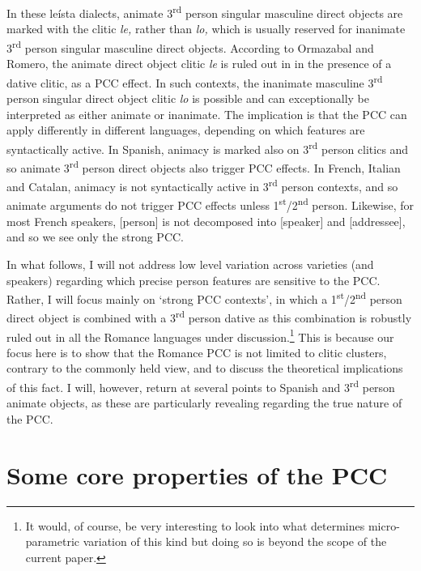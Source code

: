 \documentclass[output=paper,modfonts,nonflat]{langsci/langscibook}
\begin{document}
In these leísta dialects, animate 3\textsuperscript{rd} person singular masculine direct objects are marked with the clitic \textit{le,} rather than \textit{lo,} which is usually reserved for inanimate 3\textsuperscript{rd} person singular masculine direct objects. According to Ormazabal and Romero, the animate direct object clitic \textit{le} is ruled out in  in the presence of a dative clitic, as a PCC effect. In such contexts, the inanimate masculine 3\textsuperscript{rd} person singular direct object clitic \textit{lo} is possible and can exceptionally be interpreted as either animate or inanimate. The implication is that the PCC can apply differently in different languages, depending on which features are syntactically active. In Spanish, animacy is marked also on 3\textsuperscript{rd} person clitics and so animate 3\textsuperscript{rd} person direct objects also trigger PCC effects. In French, Italian and Catalan, animacy is not syntactically active in 3\textsuperscript{rd} person contexts, and so animate arguments do not trigger PCC effects unless 1\textsuperscript{st}/2\textsuperscript{nd} person. Likewise, for most French speakers, [person] is not decomposed into [speaker] and [addressee], and so we see only the strong PCC.

In what follows, I will not address low level variation across varieties (and speakers) regarding which precise person features are sensitive to the PCC. Rather, I will focus mainly on ‘strong PCC contexts’, in which a 1\textsuperscript{st}/2\textsuperscript{nd} person direct object is combined with a 3\textsuperscript{rd} person dative as this combination is robustly ruled out in all the Romance languages under discussion.\footnote{It would, of course, be very interesting to look into what determines micro-parametric variation of this kind but doing so is beyond the scope of the current paper.}  This is because our focus here is to show that the Romance PCC is not limited to clitic clusters, contrary to the commonly held view, and to discuss the theoretical implications of this fact. I will, however, return at several points to Spanish and 3\textsuperscript{rd} person animate objects, as these are particularly revealing regarding the true nature of the PCC. 

\section{Some core properties of the PCC} %
\end{document}
